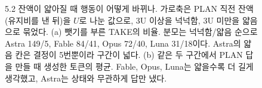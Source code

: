 \begin{figure}[t]
\caption{5.2 잔액이 얇아질 때 행동이 어떻게 바뀌나. 가로축은 PLAN 직전 잔액(유지비를 낸 뒤)을 $U$로 나눈 값으로, 3U 이상을 넉넉함, 3U 미만을 얇음으로 묶었다. (a) 뺏기를 부른 TAKE의 비율. 분모는 넉넉함/얇음 순으로 Astra 149/5, Fable 84/41, Opus 72/40, Luna 31/18이다. Astra의 얇음 칸은 결정이 5번뿐이라 구간이 넓다. (b) 같은 두 구간에서 PLAN 답을 만들 때 생성한 토큰의 평균. Fable, Opus, Luna는 얇을수록 더 길게 생각했고, Astra는 상태와 무관하게 답만 냈다.}
\label{fig:arena-take}
\end{figure}
